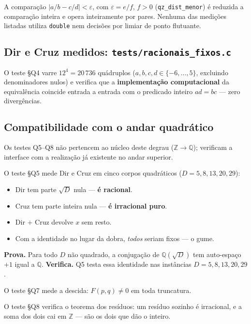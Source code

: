 \documentclass[11pt,a4paper]{article}
\newcommand{\code}[1]{\texttt{\small #1}}
\begin{document}
A comparação $|a/b - c/d| < \varepsilon$, com $\varepsilon=e/f$, $f>0$
(\code{qz\_dist\_menor}) é reduzida a comparação inteira e opera inteiramente
por pares. Nenhuma das medições listadas utiliza \code{double}
nem decisões por limiar de ponto flutuante.

\subsection*{Dir e Cruz medidos: \code{tests/racionais\_fixos.c}}

O teste §Q4 varre $12^4 = 20\,736$ quádruplos ($a,b,c,d\in\{-6,\ldots,5\}$,
excluindo denominadores nulos) e verifica que a
\textbf{implementação computacional} da equivalência coincide entrada a entrada
com o predicado inteiro $ad=bc$ --- zero divergências.

\subsection*{Compatibilidade com o andar quadrático}

Os testes Q5--Q8 não pertencem ao núcleo deste degrau ($\mathbb{Z}\to\mathbb{Q}$);
verificam a interface com a realização já existente no andar superior.

\medskip\noindent
O teste §Q5 mede Dir e Cruz em cinco corpos quadráticos ($D=5,8,13,20,29$):
\begin{itemize}
  \item Dir tem parte $\sqrt D$ nula --- \textbf{é racional}.
  \item Cruz tem parte inteira nula --- \textbf{é irracional puro}.
  \item Dir $+$ Cruz devolve $x$ sem resto.
  \item Com a identidade no lugar da dobra, \emph{todos} seriam fixos --- o gume.
\end{itemize}
\textbf{Prova.} Para todo $D$ não quadrado, a conjugação de
$\mathbb{Q}(\sqrt{D})$ tem auto-espaço $+1$ igual a $\mathbb{Q}$.
\textbf{Verifica.} Q5 testa essa identidade nas instâncias
$D=5,8,13,20,29$.

O teste §Q7 mede a descida: $F(p,q)\neq 0$ em toda truncatura.

O teste §Q8 verifica o teorema dos resíduos: um resíduo sozinho é irracional,
e a soma dos dois cai em $\mathbb{Z}$ --- são os dois que dão o inteiro.

\end{document}

